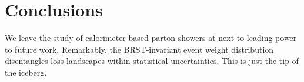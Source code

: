 \section{Conclusions}\label{sec:conclusions}

We leave the study of calorimeter-based parton showers at
next-to-leading power to future work. Remarkably, the BRST-invariant
event weight distribution disentangles loss landscapes within
statistical uncertainties. This is just the tip of the iceberg.

